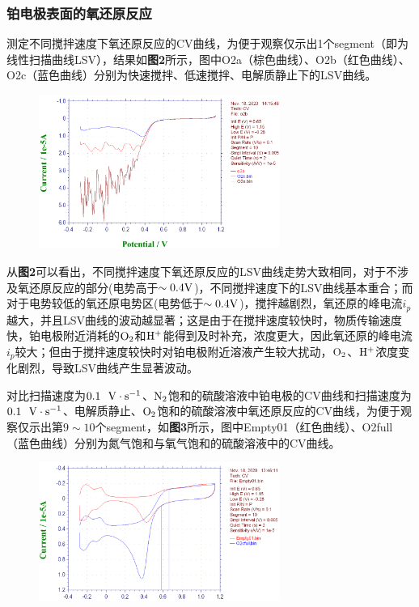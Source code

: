 \documentclass[12pt]{article}
\begin{document}
\subsubsection{铂电极表面的氧还原反应}
测定不同搅拌速度下氧还原反应的CV曲线，为便于观察仅示出1个segment（即为线性扫描曲线LSV），结果如\textbf{图2}所示，图中O2a（棕色曲线）、O2b（红色曲线）、O2c（蓝色曲线）分别为快速搅拌、低速搅拌、电解质静止下的LSV曲线。
\begin{figure}[h]
	\centering
	\includegraphics[width=0.7\textwidth]{2.bmp}
\end{figure}
\par
从\textbf{图2}可以看出，不同搅拌速度下氧还原反应的LSV曲线走势大致相同，对于不涉及氧还原反应的部分(电势高于$\sim0.4{\rm V}$)，不同搅拌速度下的LSV曲线基本重合；而对于电势较低的氧还原电势区(电势低于$\sim 0.4{\rm V}$)，搅拌越剧烈，氧还原的峰电流$i_{p}$越大，并且LSV曲线的波动越显著；这是由于在搅拌速度较快时，物质传输速度快，铂电极附近消耗的$\rm O_{2}$和$\rm H^{+}$能得到及时补充，浓度更大，因此氧还原的峰电流$i_{p}$较大；但由于搅拌速度较快时对铂电极附近溶液产生较大扰动，$\rm O_{2}$、$\rm H^{+}$浓度变化剧烈，导致LSV曲线产生显著波动。\par 
对比扫描速度为$0.1\ \ {\rm V\cdot s^{-1}}$、$\rm N_{2}$饱和的硫酸溶液中铂电极的CV曲线和扫描速度为$0.1\ \ {\rm V\cdot s^{-1}}$、电解质静止、$\rm O_{2}$饱和的硫酸溶液中氧还原反应的CV曲线，为便于观察仅示出第$9\sim 10$个segment，如\textbf{图3}所示，图中Empty01（红色曲线）、O2full（蓝色曲线）分别为氮气饱和与氧气饱和的硫酸溶液中的CV曲线。
\begin{figure}[h]
	\centering
	\includegraphics[width=0.7\textwidth]{3.bmp}
\end{figure}
\end{document}
